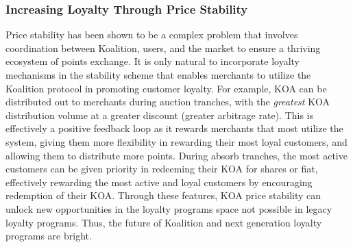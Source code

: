 \subsubsection{Increasing Loyalty Through Price Stability}

Price stability has been shown to be a complex problem that involves coordination between Koalition, users, and the market to ensure a thriving ecosystem of points exchange. It is only natural to incorporate loyalty mechanisms in the stability scheme that enables merchants to utilize the Koalition protocol in promoting customer loyalty. For example, KOA can be distributed out to merchants during auction tranches, with the \textit{greatest} KOA distribution volume at a greater discount (greater arbitrage rate). This is effectively a positive feedback loop as it rewards merchants that most utilize the system, giving them more flexibility in rewarding their most loyal customers, and allowing them to distribute more points. During absorb tranches, the most active customers can be given priority in redeeming their KOA for shares or fiat, effectively rewarding the most active and loyal customers by encouraging redemption of their KOA. Through these features, KOA price stability can unlock new opportunities in the loyalty programs space not possible in legacy loyalty programs. Thus, the future of Koalition and next generation loyalty programs are bright.